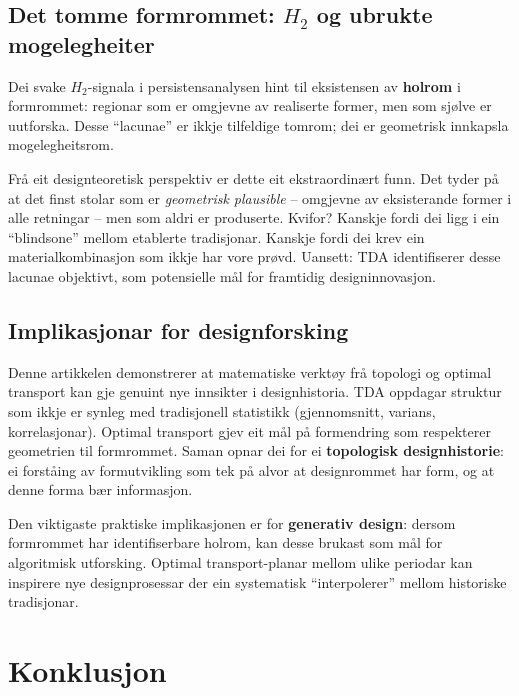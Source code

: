\documentclass[10pt, a4paper, twocolumn]{article}
\begin{document}
\subsection{Det tomme formrommet: $H_2$ og ubrukte mogelegheiter}

Dei svake $H_2$-signala i persistensanalysen hint til eksistensen av \textbf{holrom} i formrommet: regionar som er omgjevne av realiserte former, men som sj\o lve er uutforska. Desse ``lacunae'' er ikkje tilfeldige tomrom; dei er geometrisk innkapsla mogelegheitsrom.

Fr\aa{} eit designteoretisk perspektiv er dette eit ekstraordin\ae rt funn. Det tyder p\aa{} at det finst stolar som er \emph{geometrisk plausible} -- omgjevne av eksisterande former i alle retningar -- men som aldri er produserte. Kvifor? Kanskje fordi dei ligg i ein ``blindsone'' mellom etablerte tradisjonar. Kanskje fordi dei krev ein materialkombinasjon som ikkje har vore prøvd. Uansett: TDA identifiserer desse lacunae objektivt, som potensielle m\aa l for framtidig designinnovasjon.

\subsection{Implikasjonar for designforsking}

Denne artikkelen demonstrerer at matematiske verkt\o y fr\aa{} topologi og optimal transport kan gje genuint nye innsikter i designhistoria. TDA oppdagar struktur som ikkje er synleg med tradisjonell statistikk (gjennomsnitt, varians, korrelasjonar). Optimal transport gjev eit m\aa l p\aa{} formendring som respekterer geometrien til formrommet. Saman opnar dei for ei \textbf{topologisk designhistorie}: ei forst\aa ing av formutvikling som tek p\aa{} alvor at designrommet har form, og at denne forma b\ae r informasjon.

Den viktigaste praktiske implikasjonen er for \textbf{generativ design}: dersom formrommet har identifiserbare holrom, kan desse brukast som m\aa l for algoritmisk utforsking. Optimal transport-planar mellom ulike periodar kan inspirere nye designprosessar der ein systematisk ``interpolerer'' mellom historiske tradisjonar.


\section{Konklusjon}
\label{sec:konklusjon}
\end{document}
